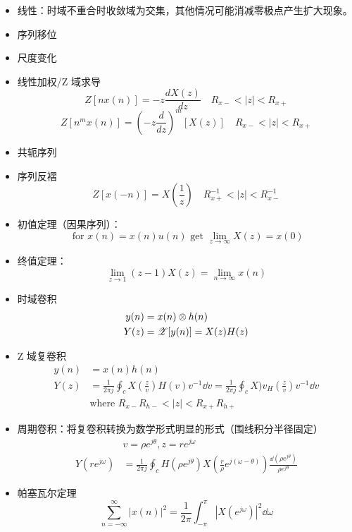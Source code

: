 \documentclass[cn,11pt,chinese,black,simple]{../elegantbook}
\begin{document}
\begin{itemize}
    \item 线性：时域不重合时收敛域为交集，其他情况可能消减零极点产生扩大现象。
    \item 序列移位
    \item 尺度变化
    \item 线性加权/Z 域求导
    \begin{equation}Z[n x(n)]=-z \frac{d X(z)}{d z} \quad R_{x-}<|z|<R_{x+}\end{equation}
    \begin{equation}Z\left[n^{m} x(n)\right]=\left(-z \frac{d}{d z}\right)^{m}[X(z)] \quad R_{x-}<|z|<R_{x+}\end{equation}
    \item 共轭序列
    \item 序列反褶
    \begin{equation}Z[x(-n)]=X\left(\frac{1}{z}\right) \quad R_{x+}^{-1}<|z|<R_{x-}^{-1}\end{equation}
    \item 初值定理（因果序列）：
    \[\text{ for } x(n) = x(n) u(n) \text{ get } \lim_{z \rightarrow \infty} X(z) = x(0)\]
    \item 终值定理：
    \[\lim_{z \rightarrow 1} (z-1) X(z) = \lim_{n \rightarrow \infty} x(n)\]
    \item 时域卷积
    \[\begin{aligned}
        y(n) &= x(n) \otimes h(n) \\ 
        Y(z) &= \mathscr{Z}[y(n)] = X(z) H(z) 
    \end{aligned}\]
    \item Z 域复卷积
    \[
    \begin{aligned}
        y(n) &= x(n) h(n) \\ 
        Y(z) &= \frac{1}{2 \pi j} \oint_c X(\frac{z}{v}) H(v) v^{-1} \dd{v} = \frac{1}{2 \pi j} \oint_c X)v_ H(\frac{z}{v}) v^{-1} \dd{v}\\
        &\text{where } R_{x-} R_{h-} < |z| < R_{x+} R_{h+}
    \end{aligned}    
    \]
    \item 周期卷积：将复卷积转换为数学形式明显的形式（围线积分半径固定）
    \[
    \begin{aligned}
        & v = \rho e^{j \theta} , z = r e^{j \omega}  \\ 
    Y(r e^{j \omega}) &= \frac{1}{2 \pi j} \oint_c H(\rho e^{j \theta}) X(\frac{r}{\rho} e^{j (\omega - \theta)}) \frac{\dd{(\rho e^{j\theta})}}{\rho e^{j\theta}}
    \end{aligned}
    \]
    \item  帕塞瓦尔定理
    \[\sum_{n = -\infty} ^{\infty} |x(n)|^2 = \frac{1}{2 \pi}\int_{-\pi} ^\pi |X(e^{j\omega} )|^2 \dd{\omega}\]
\end{itemize}
\end{document}
